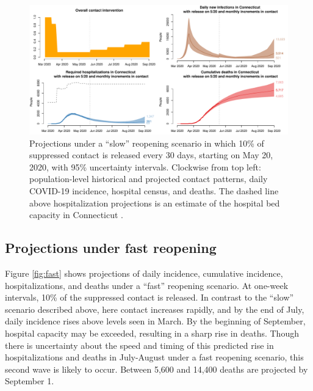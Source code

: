 \documentclass[11pt]{article}
\begin{document}
\begin{figure}
\centering
\includegraphics[width=\textwidth]{figures/slow.pdf}
\caption{Projections under a ``slow'' reopening scenario in which 10\% of suppressed contact is released every 30 days, starting on May 20, 2020, with 95\% uncertainty intervals. Clockwise from top left: population-level historical and projected contact patterns, daily COVID-19 incidence, hospital census, and deaths. The dashed line above hospitalization projections is an estimate of the hospital bed capacity in Connecticut \citep{CHAwebsite}. }

\label{fig:slow}
\end{figure}



\subsection*{Projections under fast reopening} 

Figure \ref{fig:fast} shows projections of daily incidence, cumulative incidence, hospitalizations, and deaths under a ``fast'' reopening scenario. At one-week intervals, 10\% of the suppressed contact is released.   In contrast to the ``slow'' scenario described above, here contact increases rapidly, and by the end of July, daily incidence rises above levels seen in March.  By the beginning of September, hospital capacity may be exceeded, resulting in a sharp rise in deaths.  Though there is uncertainty about the speed and timing of this predicted rise in hospitalizations and deaths in July-August under a fast reopening scenario, this second wave is likely to occur. Between 5,600 and 14,400 deaths are projected by September 1.  
\end{document}
